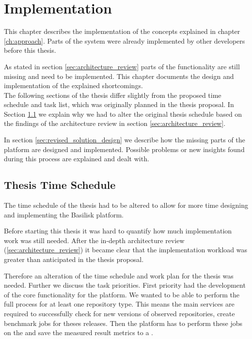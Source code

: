 \chapter{Implementation}
\label{ch:implementation}



This chapter describes the implementation of the concepts explained in chapter \ref{ch:approach}.
Parts of the system were already implemented by other developers before this thesis.

As stated in section \ref{sec:architecture_review} parts of the functionality are still missing and need to be implemented.
This chapter documents the design and implementation of the explained shortcomings.
\\

The following sections of the thesis differ slightly from the proposed time schedule and task list, which was originally planned in the thesis proposal.
In Section \ref{sec:time_schedule} we explain why we had to alter the original thesis schedule based on the findings of the architecture review in section \ref{sec:architecture_review}.


In section \ref{sec:revised_solution_design} we describe how the missing parts of the platform are designed and implemented.
Possible problems or new insights found during this process are explained and dealt with.



\section{Thesis Time Schedule}
\label{sec:time_schedule}
The time schedule of the thesis had to be altered to allow for more time designing and implementing the Basilisk platform.

Before starting this thesis it was hard to quantify how much implementation work was still needed.
After the in-depth architecture review (\ref{sec:architecture_review}) it became clear that the implementation workload was greater than anticipated in the thesis proposal.

Therefore an alteration of the time schedule and work plan for the thesis was needed.
Further we discuss the task priorities.
First priority had the development of the core functionality for the platform.
We wanted to be able to perform the full process for at least one repository type.
This means the main services are required to successfully check for new versions of observed repositories, create benchmark jobs for theses releases. 
Then the platform has to perform these jobs on the \tsp{} and save the measured result metrics to a \ts{}.

